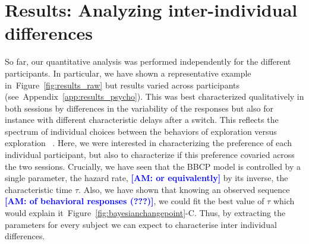 \documentclass[12pt,english]{article}%
\newcommand{\citep}[1]{\parencite{#1}}
\newcommand{\seeFig}[1]{Figure~\ref{fig:#1}}
\newcommand{\seeApp}[1]{Appendix~\ref{app:#1}}
\newcommand{\AM}[1]{\textbf{\textcolor{blue}{[AM: #1]}}}
\begin{document}
\section{Results: Analyzing inter-individual differences}
\label{sec:inter}
So far, our quantitative analysis was performed independently
for the different participants.
In particular, we have shown a representative example in~\seeFig{results_raw}
but results varied across participants (see~\seeApp{results_psycho}).
This was best characterized qualitatively in both sessions by differences
in the variability of the responses but also for instance
with different characteristic delays after a switch.
This reflects the spectrum of individual choices
between the behaviors of exploration versus exploration ~\citep{Behrens07}.
Here, we were interested in characterizing the preference
of each individual participant, but also to characterize
if this preference covaried across the two sessions.
Crucially, we have seen that the BBCP model is controlled by a single parameter,
the hazard rate, \AM{or equivalently} by its inverse, the characteristic time $\tau$.
Also, we have shown that knowing an observed sequence \AM{of behavioral responses (???)},
we could fit the best value of $\tau$ which would explain it~\seeFig{bayesianchangepoint}-C.
Thus, by extracting the parameters for every subject
we can expect to characterise inter individual differences.
\end{document}
